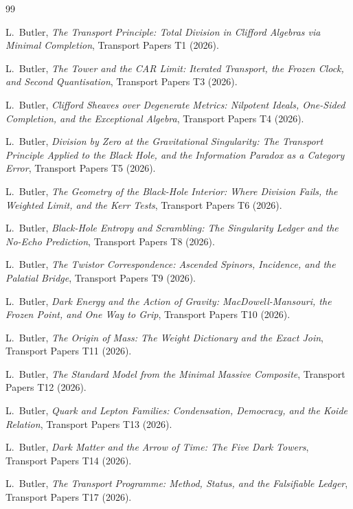 \documentclass[11pt]{article}
\theoremstyle{definition}
\begin{document}
\begin{thebibliography}{99}

L.~Butler,
\emph{The Transport Principle: Total Division in Clifford Algebras via Minimal Completion},
Transport Papers T1 (2026).

L.~Butler,
\emph{The Tower and the CAR Limit: Iterated Transport, the Frozen Clock, and Second Quantisation},
Transport Papers T3 (2026).

L.~Butler,
\emph{Clifford Sheaves over Degenerate Metrics: Nilpotent Ideals, One-Sided Completion, and the Exceptional Algebra},
Transport Papers T4 (2026).

L.~Butler,
\emph{Division by Zero at the Gravitational Singularity: The Transport Principle Applied to the Black Hole, and the Information Paradox as a Category Error},
Transport Papers T5 (2026).

L.~Butler,
\emph{The Geometry of the Black-Hole Interior: Where Division Fails, the Weighted Limit, and the Kerr Tests},
Transport Papers T6 (2026).

L.~Butler,
\emph{Black-Hole Entropy and Scrambling: The Singularity Ledger and the No-Echo Prediction},
Transport Papers T8 (2026).

L.~Butler,
\emph{The Twistor Correspondence: Ascended Spinors, Incidence, and the Palatial Bridge},
Transport Papers T9 (2026).

L.~Butler,
\emph{Dark Energy and the Action of Gravity: MacDowell-Mansouri, the Frozen Point, and One Way to Grip},
Transport Papers T10 (2026).

L.~Butler,
\emph{The Origin of Mass: The Weight Dictionary and the Exact Join},
Transport Papers T11 (2026).

L.~Butler,
\emph{The Standard Model from the Minimal Massive Composite},
Transport Papers T12 (2026).

L.~Butler,
\emph{Quark and Lepton Families: Condensation, Democracy, and the Koide Relation},
Transport Papers T13 (2026).

L.~Butler,
\emph{Dark Matter and the Arrow of Time: The Five Dark Towers},
Transport Papers T14 (2026).

L.~Butler,
\emph{The Transport Programme: Method, Status, and the Falsifiable Ledger},
Transport Papers T17 (2026).


\end{thebibliography}
\end{document}
